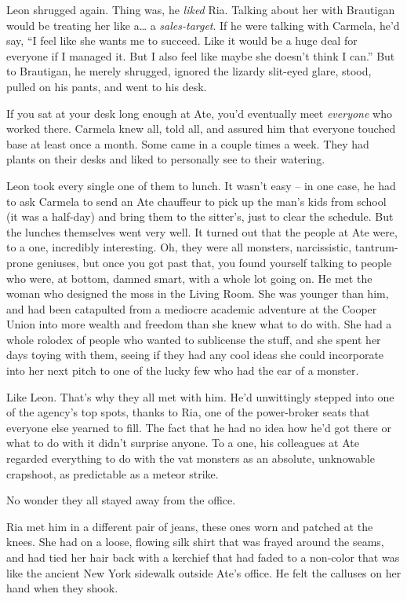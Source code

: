 Leon shrugged again. Thing was, he \emph{liked} Ria. Talking about her 
with Brautigan would be treating her like a\ldots{} a \emph{sales-target}. 
If he were talking with Carmela, he'd say, “I feel like she wants me 
to succeed. Like it would be a huge deal for everyone if I managed it. 
But I also feel like maybe she doesn't think I can.” But to 
Brautigan, he merely shrugged, ignored the lizardy slit-eyed glare, 
stood, pulled on his pants, and went to his desk.

\tb

If you sat at your desk long enough at Ate, you'd eventually meet 
\emph{everyone} who worked there. Carmela knew all, told all, and 
assured him that everyone touched base at least once a month. Some came 
in a couple times a week. They had plants on their desks and liked to 
personally see to their watering.

Leon took every single one of them to lunch. It wasn't easy -- in one 
case, he had to ask Carmela to send an Ate chauffeur to pick up the 
man's kids from school (it was a half-day) and bring them to the 
sitter's, just to clear the schedule. But the lunches themselves went 
very well. It turned out that the people at Ate were, to a one, 
incredibly interesting. Oh, they were all monsters, narcissistic, 
tantrum-prone geniuses, but once you got past that, you found yourself 
talking to people who were, at bottom, damned smart, with a whole lot 
going on. He met the woman who designed the moss in the Living Room. 
She was younger than him, and had been catapulted from a mediocre 
academic adventure at the Cooper Union into more wealth and freedom 
than she knew what to do with. She had a whole rolodex of people who 
wanted to sublicense the stuff, and she spent her days toying with 
them, seeing if they had any cool ideas she could incorporate into her 
next pitch to one of the lucky few who had the ear of a monster.

Like Leon. That's why they all met with him. He'd unwittingly stepped 
into one of the agency's top spots, thanks to Ria, one of the 
power-broker seats that everyone else yearned to fill. The fact that he 
had no idea how he'd got there or what to do with it didn't surprise 
anyone. To a one, his colleagues at Ate regarded everything to do with 
the vat monsters as an absolute, unknowable crapshoot, as predictable 
as a meteor strike.

No wonder they all stayed away from the office.

\tb

Ria met him in a different pair of jeans, these ones worn and patched 
at the knees. She had on a loose, flowing silk shirt that was frayed 
around the seams, and had tied her hair back with a kerchief that had 
faded to a non-color that was like the ancient New York sidewalk 
outside Ate's office. He felt the calluses on her hand when they shook.

